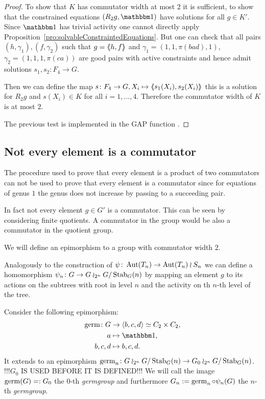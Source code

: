 \documentclass[a4paper,11pt]{amsart}
\begin{document}
\begin{proof}
 To show that $K$ has commutator width at most $2$ it is sufficient, to show that 
 the constrained equations $(R_2g,\id)$ have solutions for all $g\in K'$. 
 Since $\id$ has trivial activity one cannot directly apply 
 Proposition~\ref{pro:solvableConstraintedEquations}.  But one can check that all 
 pairs $(h,\gamma_1),(f,\gamma_2)$ such that $g=\langle\negthickspace\langle h,f\rangle\negthickspace\rangle$ and
 $\gamma_1=(1,1,\pi(bad),1)$, $\gamma_2=(1,1,1,\pi(ca))$ are good pairs with active
 constraints and hence admit solutions $s_1,s_2\colon F_4\to G$.
 
 Then we can define the map $s\colon F_4\to G, X_i\mapsto \langle\negthickspace\langle s_1(X_i),s_2(X_i)\rangle\negthickspace\rangle$ this is a solution
 for $R_2g$ and $s(X_i)\in K$ for all $i=1,\dotsc,4$. Therefore the commutator width of $K$ is at most $2$.
 
 The previous test is implemented in the GAP function . 
\end{proof}

\subsection{Not every element is a commutator}
The procedure used to prove that every element is a product of two commutators 
can not be used to prove that every element is a
commutator since for equations of genus $1$ the 
genus does not increase by passing to a succeeding pair. 

In fact not every element $g\in G'$ is a commutator. This can be seen by
considering finite quotients. A commutator in the group would be also a
commutator in the quotient group. 

We will define an epimorphism to a group with commutator width $2$.

Analogously to the construction of $\psi\colon \operatorname{{Aut}}(T_n )\to \operatorname{{Aut}}(T_n) \wr S_n$
we can define a homomorphism $\psi_n\colon G \to G\wr_{2^n} {G/\operatorname{Stab}_G(n)}$ by
mapping an element $g$ to its actions on the subtrees with root in level $n$
and the activity on th $n$-th level of the tree.

Consider the following epimorphism:
\begin{align*}
\germ\colon G&\to\left<b,c,d\right>\simeq C_2\times C_2, \\
a&\mapsto\id,\\
b,c,d&\mapsto b,c,d.
\end{align*} It extends to 
an epimorphism $\operatorname{germ}_n\colon G\wr_{2^n} {G/\operatorname{Stab}_G(n)}\to G_0\wr_{2^n} {G/\operatorname{Stab}_G(n)}$. !!!$G_0$ IS USED BEFORE IT IS DEFINED!!!
We will call the image $\operatorname{germ}(G)=:G_0$ the $0$-th \emph{germgroup} and furthermore
$G_n := \operatorname{germ}_n \circ \psi_n(G)$ the $n$-th \emph{germgroup}.
\end{document}
